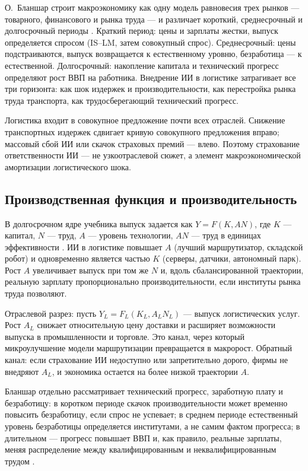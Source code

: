\documentclass[a4paper,14pt]{extarticle}
\begin{document}
О.~Бланшар строит макроэкономику как одну модель равновесия трех рынков --- товарного, финансового и рынка труда --- и различает короткий, среднесрочный и долгосрочный периоды \cite{blanchard}. Краткий период: цены и зарплаты жестки, выпуск определяется спросом (IS--LM, затем совокупный спрос). Среднесрочный: цены подстраиваются, выпуск возвращается к естественному уровню, безработица --- к естественной. Долгосрочный: накопление капитала и технический прогресс определяют рост ВВП на работника. Внедрение ИИ в логистике затрагивает все три горизонта: как шок издержек и производительности, как перестройка рынка труда транспорта, как трудосберегающий технический прогресс.

Логистика входит в совокупное предложение почти всех отраслей. Снижение транспортных издержек сдвигает кривую совокупного предложения вправо; массовый сбой ИИ или скачок страховых премий --- влево. Поэтому страхование ответственности ИИ --- не узкоотраслевой сюжет, а элемент макроэкономической амортизации логистического шока.

\subsection{Производственная функция и производительность}

В долгосрочном ядре учебника выпуск задается как $Y=F(K,AN)$, где $K$ --- капитал, $N$ --- труд, $A$ --- уровень технологии, $AN$ --- труд в единицах эффективности \cite{blanchard}. ИИ в логистике повышает $A$ (лучший маршрутизатор, складской робот) и одновременно является частью $K$ (серверы, датчики, автономный парк). Рост $A$ увеличивает выпуск при том же $N$ и, вдоль сбалансированной траектории, реальную зарплату пропорционально производительности, если институты рынка труда позволяют.

Отраслевой разрез: пусть $Y_L=F_L(K_L,A_L N_L)$ --- выпуск логистических услуг. Рост $A_L$ снижает относительную цену доставки и расширяет возможности выпуска в промышленности и торговле. Это канал, через который микроулучшение модели маршрутизации превращается в макророст. Обратный канал: если страхование ИИ недоступно или запретительно дорого, фирмы не внедряют $A_L$, и экономика остается на более низкой траектории $A$.

Бланшар отдельно рассматривает технический прогресс, заработную плату и безработицу: в коротком периоде скачок производительности может временно повысить безработицу, если спрос не успевает; в среднем периоде естественный уровень безработицы определяется институтами, а не самим фактом прогресса; в длительном --- прогресс повышает ВВП и, как правило, реальные зарплаты, меняя распределение между квалифицированным и неквалифицированным трудом \cite{blanchard}.
\end{document}

